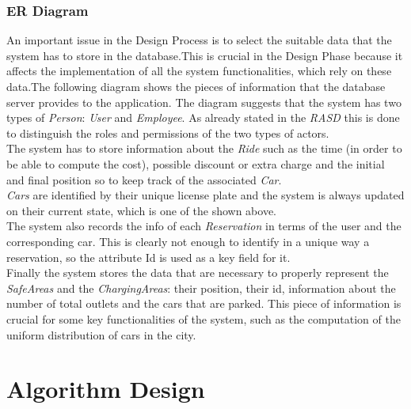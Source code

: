 \documentclass[11pt,a4paper]{report}
\begin{document}
\subsection{ER Diagram}
An important issue in the Design Process is to select the suitable data that the system has to store in the database.This is crucial in the Design Phase because it affects the implementation of all the system functionalities, which rely on these data.The following diagram shows the pieces of information that the database server provides to the application.
\noindent The diagram suggests that the system has two types of \textit{Person}: \textit{User} and \textit{Employee}. As already stated in the \textit{RASD} this is done to distinguish the roles and permissions of the two types of actors.\\
The system has to store information about the \textit{Ride} such as the time (in order to be able to compute the cost), possible discount or extra charge and the initial and final position so to keep track of the associated \textit{Car}.\\\textit{Cars} are identified by their unique license plate and the system is always updated on their current state, which is one of the shown above.\\The system also records the info of each \textit{Reservation} in terms of the user and the corresponding car. This is clearly not enough to identify in a unique way a reservation, so the attribute Id is used as a key field for it.\\
Finally the system stores the data that are necessary to properly represent the \textit{SafeAreas} and the \textit{ChargingAreas}: their position, their id, information about the number of total outlets and the cars that are parked. This piece of information is crucial for some key functionalities of the system, such as the computation of the uniform distribution of cars in the city.

\chapter{Algorithm Design}
\end{document}
